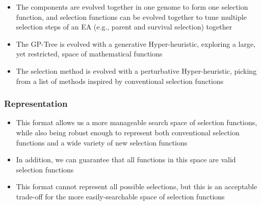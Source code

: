 \documentclass{beamer}
\begin{document}
\begin{frame}
\begin{columns}
\begin{column}{0.5\textwidth}
		\end{column}
		\end{columns}		

	\end{frame}			
	
	\begin{frame}
		\begin{itemize}
			 \item<1-|alert@1> The components are evolved together in one genome to form one selection function, and selection functions can be evolved together to tune multiple selection steps of an EA (e.g., parent and survival selection) together
			 \item<2-|alert@2> The GP-Tree is evolved with a generative Hyper-heuristic, exploring a large, yet restricted, space of mathematical functions
			 \item<3-|alert@3> The selection method is evolved with a perturbative Hyper-heuristic, picking from a list of methods inspired by conventional selection functions
		
		\end{itemize}
	\end{frame}	
	
	\begin{frame}
		\frametitle{Representation}
		
		\begin{itemize}
			 \item<1-|alert@1> This format allows us a more manageable search space of selection functions, while also being robust enough to represent both conventional selection functions and a wide variety of new selection functions
			 \item<2-|alert@2> In addition, we can guarantee that all functions in this space are valid selection functions
			 \item<3-|alert@3> This format cannot represent all possible selections, but this is an acceptable trade-off for the more easily-searchable space of selection functions
		\end{itemize}
	\end{frame}		
	
\end{document}
